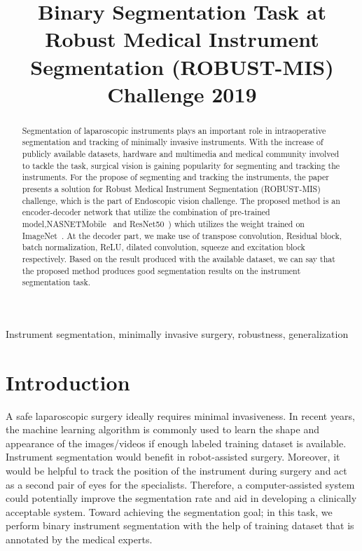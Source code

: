 \documentclass[conference]{IEEEtran}
\begin{document}
\title{Binary Segmentation Task at Robust Medical Instrument Segmentation (ROBUST-MIS) Challenge 2019}



\maketitle
\thispagestyle{fancy}

\begin{abstract}
Segmentation of laparoscopic instruments plays an important role in intraoperative segmentation and tracking of minimally invasive instruments. With the increase of publicly available datasets, hardware and multimedia and medical community involved to tackle the task, surgical vision is gaining popularity for segmenting and tracking the instruments. For the propose of segmenting and tracking the instruments, the paper presents a solution for Robust Medical Instrument Segmentation (ROBUST-MIS) challenge, which is the part of Endoscopic vision challenge. The proposed method is an encoder-decoder network that utilize the combination of pre-trained model,\ac{NASNETMobile}~\cite{zoph2018learning} and ResNet50~\cite{he2016deep}) which utilizes the weight trained on ImageNet~\cite{deng2009imagenet}. At the decoder part, we make use of transpose convolution, Residual block, batch normalization, \ac{ReLU}, dilated convolution, squeeze and excitation block respectively. Based on the result produced with the available dataset, we can say that the proposed method produces good segmentation results on the instrument segmentation task. \\

\end{abstract}

\begin{IEEEkeywords}
Instrument segmentation, minimally invasive surgery, robustness, generalization
\end{IEEEkeywords}

\section{Introduction}
A safe laparoscopic surgery ideally requires minimal invasiveness. In recent years, the machine learning algorithm is commonly used to learn the shape and appearance of the images/videos if enough labeled training dataset is available. Instrument segmentation would benefit in robot-assisted surgery. Moreover, it would be helpful to track the position of the instrument during surgery and act as a second pair of eyes for the specialists. Therefore, a computer-assisted system could potentially improve the segmentation rate and aid in developing a clinically acceptable system. Toward achieving the segmentation goal; in this task, we perform binary instrument segmentation with the help of training dataset that is annotated by the medical experts. 
\end{document}
